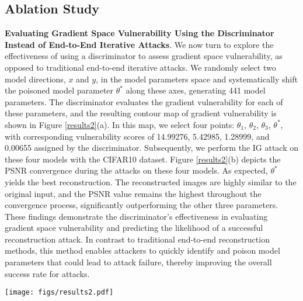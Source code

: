 \subsection{Ablation Study}
\textbf{Evaluating Gradient Space Vulnerability Using the Discriminator Instead of End-to-End Iterative Attacks}. We now turn to explore the effectiveness of using a discriminator to assess gradient space vulnerability, as opposed to traditional end-to-end iterative attacks. We randomly select two model directions, $x$ and $y$, in the model parameters space and systematically shift the poisoned model parameter $\theta^{*}$ along these axes, generating 441 model parameters. The discriminator evaluates the gradient vulnerability for each of these parameters, and the resulting contour map of gradient vulnerability is shown in Figure \ref{results2}(a). In this map, we select four points: $\theta_{1}$, $\theta_{2}$, $\theta_{3}$, $\theta^{*}$, with corresponding vulnerability scores of 14.99276, 5.42985, 1.28999, and 0.00655 assigned by the discriminator. Subsequently, we perform the IG attack on these four models with the CIFAR10 dataset. Figure \ref{results2}(b) depicts the PSNR convergence during the attacks on these four models. As expected, $\theta^{*}$ yields the best reconstruction. The reconstructed images are highly similar to the original input, and the PSNR value remains the highest throughout the convergence process, significantly outperforming the other three parameters. These findings demonstrate the discriminator’s effectiveness in evaluating gradient space vulnerability and predicting the likelihood of a successful reconstruction attack. In contrast to traditional end-to-end reconstruction methods, this method enables attackers to quickly identify and poison model parameters that could lead to attack failure, thereby improving the overall success rate for attacks.
\begin{figure*}[b]
    \centering
    \texttt{[image: figs/results2.pdf]}
    \caption{Figure (a): Contour map of the discriminator loss landscape across 441 model parameters generated by shifting $\theta^{*}$ along two random directions. The map marks the selected points $\theta_{1}$, $\theta_{2}$, $\theta_{3}$, and $\theta^{*}$. Figure (b): PSNR curves from IG attacks on a ResNet18 model at $\theta_{1}$, $\theta_{2}$, $\theta_{3}$, and $\theta^{*}$, demonstrating that $\theta^{*}$ achieves the best reconstruction quality.}
    \label{results2}
\end{figure*}

